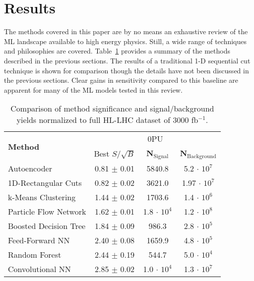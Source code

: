 \section{Results}
\label{sec:results}

The methods covered in this paper are by no means an exhaustive review of the ML landscape available to high energy physics. Still, a wide range of techniques and philosophies are covered. Table~\ref{tab:summary} provides a summary of the methods described in the previous sections. The results of a traditional 1-D sequential cut technique is shown for comparison though the details have not been discussed in the previous sections. Clear gains in sensitivity compared to this baseline are apparent for many of the ML models tested in this review.

\begin{table}[h!]
\label{tab:summary}
  \begin{center}
  \begin{tabular}{|l|c|c|c|} %
      \hline\hline
      \multirow{2}{*}{\textbf{Method}} & \multicolumn{3}{c|}{0PU} \\
      \cline{2-4}
      & Best $S/\sqrt{B}$ & \textbf{N$_{\mathrm{Signal}}$} & \textbf{N$_{\mathrm{Background}}$} \\
      \hline
      Autoencoder           & 0.81 $\pm$ 0.01 & 5840.8 & 5.2 $\cdot$ $10^7$ \\
      1D-Rectangular Cuts   & 0.82 $\pm$ 0.02 & 3621.0 & 1.97 $\cdot$ $10^7$ \\
      k-Means Clustering    & 1.44 $\pm$ 0.02 & 1703.6 & 1.4 $\cdot$ $10^6$ \\
      Particle Flow Network & 1.62 $\pm$ 0.01 & 1.8 $\cdot$ $10^4$ & 1.2 $\cdot$ $10^8$ \\
      Boosted Decision Tree & 1.84 $\pm$ 0.09 & 986.3  & 2.8 $\cdot$ $10^5$ \\
      Feed-Forward NN       & 2.40 $\pm$ 0.08 & 1659.9 & 4.8 $\cdot$ $10^5$ \\
      Random Forest         & 2.44 $\pm$ 0.19 & 544.7 & 5.0 $\cdot$ $10^4$ \\
      Convolutional NN      & 2.85 $\pm$ 0.02 & 1.0 $\cdot$ $10^4$ & 1.3 $\cdot$ $10^7$ \\
      \hline\hline
    \end{tabular}
    \caption{Comparison of method significance and signal/background yields normalized to full HL-LHC dataset of 3000 fb$^{-1}$.}
  \end{center}
\end{table}

